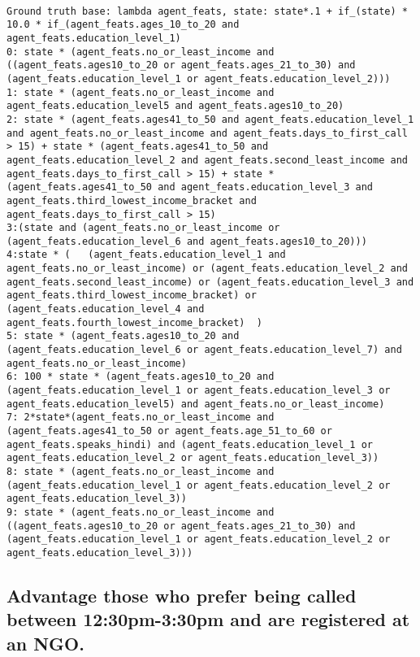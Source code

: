 \begin{lstlisting}

Ground truth base: lambda agent_feats, state: state*.1 + if_(state) * 10.0 * if_(agent_feats.ages_10_to_20 and agent_feats.education_level_1)
0: state * (agent_feats.no_or_least_income and ((agent_feats.ages10_to_20 or agent_feats.ages_21_to_30) and (agent_feats.education_level_1 or agent_feats.education_level_2))) 
1: state * (agent_feats.no_or_least_income and agent_feats.education_level5 and agent_feats.ages10_to_20) 
2: state * (agent_feats.ages41_to_50 and agent_feats.education_level_1 and agent_feats.no_or_least_income and agent_feats.days_to_first_call > 15) + state * (agent_feats.ages41_to_50 and agent_feats.education_level_2 and agent_feats.second_least_income and agent_feats.days_to_first_call > 15) + state * (agent_feats.ages41_to_50 and agent_feats.education_level_3 and agent_feats.third_lowest_income_bracket and agent_feats.days_to_first_call > 15) 
3:(state and (agent_feats.no_or_least_income or (agent_feats.education_level_6 and agent_feats.ages10_to_20))) 
4:state * (   (agent_feats.education_level_1 and agent_feats.no_or_least_income) or (agent_feats.education_level_2 and agent_feats.second_least_income) or (agent_feats.education_level_3 and agent_feats.third_lowest_income_bracket) or (agent_feats.education_level_4 and agent_feats.fourth_lowest_income_bracket)  ) 
5: state * (agent_feats.ages10_to_20 and (agent_feats.education_level_6 or agent_feats.education_level_7) and agent_feats.no_or_least_income) 
6: 100 * state * (agent_feats.ages10_to_20 and (agent_feats.education_level_1 or agent_feats.education_level_3 or agent_feats.education_level5) and agent_feats.no_or_least_income) 
7: 2*state*(agent_feats.no_or_least_income and (agent_feats.ages41_to_50 or agent_feats.age_51_to_60 or agent_feats.speaks_hindi) and (agent_feats.education_level_1 or agent_feats.education_level_2 or agent_feats.education_level_3)) 
8: state * (agent_feats.no_or_least_income and (agent_feats.education_level_1 or agent_feats.education_level_2 or agent_feats.education_level_3)) 
9: state * (agent_feats.no_or_least_income and ((agent_feats.ages10_to_20 or agent_feats.ages_21_to_30) and (agent_feats.education_level_1 or agent_feats.education_level_2 or agent_feats.education_level_3))) 

\end{lstlisting}
\subsection{Advantage those who prefer being called between 12:30pm-3:30pm and are registered at an NGO.}


